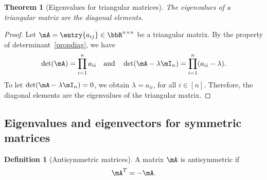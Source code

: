 \documentclass[11pt]{article}
\theoremstyle{plain}
\newtheorem{thm}{Theorem}[section]
\theoremstyle{definition}
\newtheorem{defn}{Definition}
\begin{document}
\begin{thm}[Eigenvalues for triangular matrices]\label{thm:trianeigen}
	The eigenvalues of a triangular matrix are the diagonal elements.
\end{thm}

\begin{proof}
Let $\mA = \entry{a_{ij}} \in \bbR^{n \times n}$ be a triangular matrix. By the property of determinant~\ref{propdiag}, we have
\[ \det(\mA) = \prod_{i=1}^n a_{ii}  \quad \text{and} \quad \det(\mA - \lambda \mI_n) = \prod_{i=1}^n (a_{ii}-\lambda). \]
To let $\det(\mA - \lambda \mI_n) = 0$, we obtain $\lambda = a_{ii}$, for all $ i\in[n]$. Therefore, the diagonal elements are the eigenvalues of the triangular matrix.
\end{proof}


\subsection{Eigenvalues and eigenvectors for symmetric matrices}

\begin{defn}[Antisymmetric matrices]
	A matrix $\mA$ is antisymmetric if 
	\[\mA^T = - \mA. \] 
\end{defn}
\end{document}
